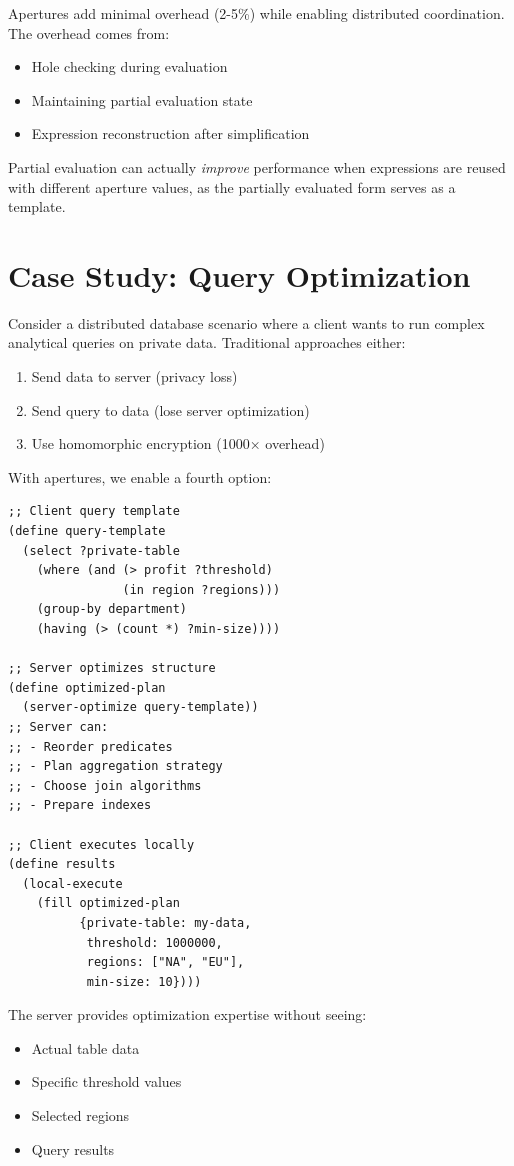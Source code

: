 \documentclass[10pt]{article}
\begin{document}
Apertures add minimal overhead (2-5\%) while enabling distributed coordination. The overhead comes from:
\begin{itemize}
\item Hole checking during evaluation
\item Maintaining partial evaluation state
\item Expression reconstruction after simplification
\end{itemize}

Partial evaluation can actually \textit{improve} performance when expressions are reused with different aperture values, as the partially evaluated form serves as a template.

\section{Case Study: Query Optimization}

Consider a distributed database scenario where a client wants to run complex analytical queries on private data. Traditional approaches either:
\begin{enumerate}
\item Send data to server (privacy loss)
\item Send query to data (lose server optimization)
\item Use homomorphic encryption (1000× overhead)
\end{enumerate}

With apertures, we enable a fourth option:

\begin{lstlisting}
;; Client query template
(define query-template
  (select ?private-table
    (where (and (> profit ?threshold)
                (in region ?regions)))
    (group-by department)
    (having (> (count *) ?min-size))))

;; Server optimizes structure
(define optimized-plan
  (server-optimize query-template))
;; Server can:
;; - Reorder predicates
;; - Plan aggregation strategy
;; - Choose join algorithms
;; - Prepare indexes

;; Client executes locally
(define results
  (local-execute
    (fill optimized-plan
          {private-table: my-data,
           threshold: 1000000,
           regions: ["NA", "EU"],
           min-size: 10})))
\end{lstlisting}

The server provides optimization expertise without seeing:
\begin{itemize}
\item Actual table data
\item Specific threshold values
\item Selected regions
\item Query results
\end{itemize}
\end{document}
